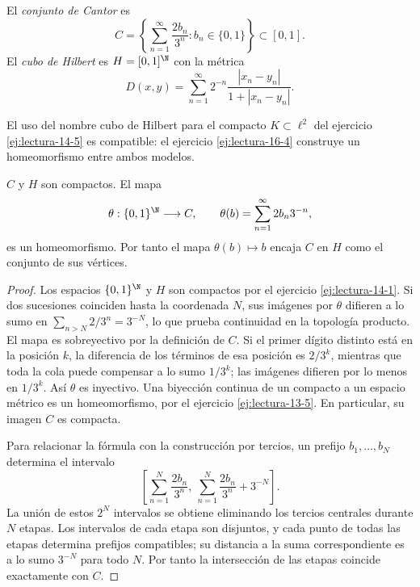 \begin{definicion}
El \emph{conjunto de Cantor} es
\[
C=\left\{\sum_{n=1}^\infty\frac{2b_n}{3^n}:b_n\in\{0,1\}\right\}\subset[0,1].
\]
El \emph{cubo de Hilbert} es $H=[0,1]^{\N}$ con la métrica
\[
D(x,y)=\sum_{n=1}^\infty2^{-n}\frac{|x_n-y_n|}{1+|x_n-y_n|}.
\]
\end{definicion}
El uso del nombre cubo de Hilbert para el compacto $K\subset\ell^2$ del ejercicio \ref{ej:lectura-14-5} es compatible: el ejercicio \ref{ej:lectura-16-4} construye un homeomorfismo entre ambos modelos.

\begin{proposicion}\label{ch16:cantor}
$C$ y $H$ son compactos. El mapa
\[
\theta:\{0,1\}^{\N}\longrightarrow C,\qquad
\theta(b)=\sum_{n=1}^\infty2b_n3^{-n},
\]
es un homeomorfismo. Por tanto el mapa $\theta(b)\mapsto b$ encaja $C$ en $H$ como el conjunto de sus vértices.
\end{proposicion}
\begin{proof}
Los espacios $\{0,1\}^{\N}$ y $H$ son compactos por el ejercicio \ref{ej:lectura-14-1}. Si dos sucesiones coinciden hasta la coordenada $N$, sus imágenes por $\theta$ difieren a lo sumo en $\sum_{n>N}2/3^n=3^{-N}$, lo que prueba continuidad en la topología producto. El mapa es sobreyectivo por la definición de $C$. Si el primer dígito distinto está en la posición $k$, la diferencia de los términos de esa posición es $2/3^k$, mientras que toda la cola puede compensar a lo sumo $1/3^k$; las imágenes difieren por lo menos en $1/3^k$. Así $\theta$ es inyectivo. Una biyección continua de un compacto a un espacio métrico es un homeomorfismo, por el ejercicio \ref{ej:lectura-13-5}. En particular, su imagen $C$ es compacta.

Para relacionar la fórmula con la construcción por tercios, un prefijo $b_1,\ldots,b_N$ determina el intervalo
\[
\left[\sum_{n=1}^N\frac{2b_n}{3^n},\ 
\sum_{n=1}^N\frac{2b_n}{3^n}+3^{-N}\right].
\]
La unión de estos $2^N$ intervalos se obtiene eliminando los tercios centrales durante $N$ etapas. Los intervalos de cada etapa son disjuntos, y cada punto de todas las etapas determina prefijos compatibles; su distancia a la suma correspondiente es a lo sumo $3^{-N}$ para todo $N$. Por tanto la intersección de las etapas coincide exactamente con $C$.
\end{proof}

